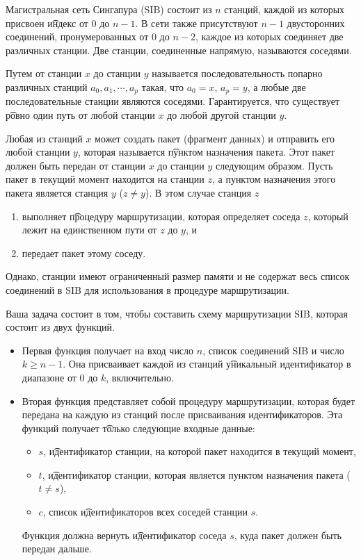 Магистральная сеть Сингапура (SIB) состоит из $n$ станций, каждой из которых присвоен \t{индекс} от $0$ до $n-1$. В сети также присутствуют $n-1$ двусторонних соединений, пронумерованных от $0$ до $n-2$, каждое из которых соединяет две различных станции.
Две станции, соединенные напрямую, называются соседями.

Путем от станции $x$ до станции $y$ называется последовательность попарно различных станций $a_0,a_1,\cdots,a_p$ такая, что $a_0=x$, $a_p=y$, а любые две последовательные станции являются соседями. Гарантируется, что существует \t{ровно один} путь от любой станции $x$ до любой другой станции $y$.

Любая из станций $x$ может создать пакет (фрагмент данных) и отправить его любой станции $y$, которая называется \t{пунктом назначения} пакета. Этот пакет должен быть передан от станции $x$ до станции $y$ следующим образом.
Пусть пакет в текущий момент находится на станции $z$, а пунктом назначения этого пакета является станция $y$ ($z \neq y$).
В этом случае станция $z$
\begin{enumerate}
\item выполняет \t{процедуру маршрутизации}, которая определяет соседа $z$, который лежит на единственном пути от $z$ до $y$, и
\item передает пакет этому соседу.
\end{enumerate}

Однако, станции имеют ограниченный размер памяти и не содержат весь список соединений в SIB для использования в процедуре маршрутизации.

Ваша задача состоит в том, чтобы составить схему маршрутизации SIB, которая состоит из двух функций.
\begin{itemize}
\item Первая функция получает на вход число $n$, список соединений SIB и число $k \geq n-1$. Она присваивает каждой из станций \t{уникальный идентификатор} в диапазоне от $0$ до $k$, включительно. 
\item Вторая функция представляет собой процедуру маршрутизации, которая будет передана на каждую из станций после присваивания идентификаторов. Эта функций получает \t{только} следующие входные данные:
\begin{itemize}
  \item $s$, \t{идентификатор} станции, на которой пакет находится в текущий момент,
  \item $t$, \t{идентификатор} станции, которая является пунктом назначения пакета ($t \neq s$),
  \item $c$, список \t{идентификаторов} всех соседей станции $s$.
\end{itemize}
  Функция должна вернуть \t{идентификатор} соседа $s$, куда пакет должен быть передан дальше.
\end{itemize}

